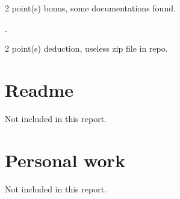 \documentclass{article}
\begin{document}
\inputminted[firstline=25,lastline=48]{elm}{Collision.elm}

2 point(s) {\color{red}bonus}, some documentations found.\medskip

.\medskip

2 point(s) {\color{red}deduction}, useless zip file in repo.\medskip



\newpage

\section{Readme}

Not included in this report.

\section{Personal work}

Not included in this report.


\newpage
\end{document}
